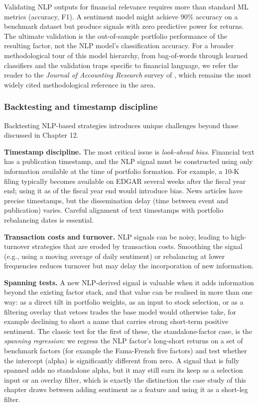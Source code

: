 Validating NLP outputs for financial relevance requires more than standard ML metrics (accuracy, F1). A sentiment model might achieve 90\% accuracy on a benchmark dataset but produce signals with zero predictive power for returns. The ultimate validation is the out-of-sample portfolio performance of the resulting factor, not the NLP model's classification accuracy. For a broader methodological tour of this model hierarchy, from bag-of-words through learned classifiers and the validation traps specific to financial language, we refer the reader to the \textit{Journal of Accounting Research} survey of \cite{loughran2016textual}, which remains the most widely cited methodological reference in the area.

\subsubsection{Backtesting and timestamp discipline}

Backtesting NLP-based strategies introduces unique challenges beyond those discussed in Chapter 12.

\textbf{Timestamp discipline.} The most critical issue is \textit{look-ahead bias}. Financial text has a publication timestamp, and the NLP signal must be constructed using only information available at the time of portfolio formation. For example, a 10-K filing typically becomes available on EDGAR several weeks after the fiscal year end; using it as of the fiscal year end would introduce bias. News articles have precise timestamps, but the dissemination delay (time between event and publication) varies. Careful alignment of text timestamps with portfolio rebalancing dates is essential.

\textbf{Transaction costs and turnover.} NLP signals can be noisy, leading to high-turnover strategies that are eroded by transaction costs. Smoothing the signal (e.g., using a moving average of daily sentiment) or rebalancing at lower frequencies reduces turnover but may delay the incorporation of new information.

\textbf{Spanning tests.} A new NLP-derived signal is valuable when it adds information beyond the existing factor stack, and that value can be realised in more than one way: as a direct tilt in portfolio weights, as an input to stock selection, or as a filtering overlay that vetoes trades the base model would otherwise take, for example declining to short a name that carries strong short-term positive sentiment. The classic test for the first of these, the standalone-factor case, is the \textit{spanning regression}: we regress the NLP factor's long-short returns on a set of benchmark factors (for example the Fama-French five factors) and test whether the intercept (alpha) is significantly different from zero. A signal that is fully spanned adds no standalone alpha, but it may still earn its keep as a selection input or an overlay filter, which is exactly the distinction the case study of this chapter draws between adding sentiment as a feature and using it as a short-leg filter.

